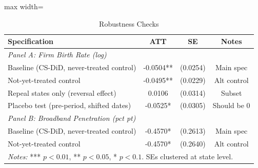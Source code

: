 \begin{table}[htbp]
\centering
\caption{Robustness Checks}
\label{tab:robustness}
\begin{adjustbox}{max width=\textwidth}\small\begin{tabular}{lccc}
\hline\hline
Specification & ATT & SE & Notes \\
\hline
\multicolumn{4}{l}{\textit{Panel A: Firm Birth Rate (log)}} \\
Baseline (CS-DiD, never-treated control) & -0.0504** & (0.0254) & Main spec \\
Not-yet-treated control & -0.0495** & (0.0229) & Alt control \\
Repeal states only (reversal effect) & 0.0106 & (0.0314) & Subset \\
Placebo test (pre-period, shifted dates) & -0.0525* & (0.0305) & Should be 0 \\
\hline
\multicolumn{4}{l}{\textit{Panel B: Broadband Penetration (pct pt)}} \\
Baseline (CS-DiD, never-treated control) & -0.4570* & (0.2613) & Main spec \\
Not-yet-treated control & -0.4570* & (0.2640) & Alt control \\
\hline
\multicolumn{4}{l}{\textit{Notes:} *** $p<0.01$, ** $p<0.05$, * $p<0.1$. SEs clustered at state level.}\\
\hline
\end{tabular}\end{adjustbox}
\end{table}

